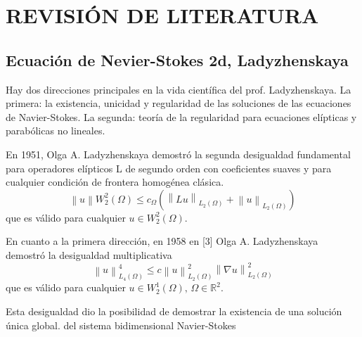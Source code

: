 

\chapter{REVISIÓN DE LITERATURA}
\section{Ecuación de Nevier-Stokes 2d, Ladyzhenskaya}
Hay dos direcciones principales en la vida científica del prof. Ladyzhenskaya. La primera: la existencia, unicidad y regularidad de las soluciones de las ecuaciones de Navier-Stokes. La segunda: teoría de la regularidad para ecuaciones elípticas y parabólicas no lineales.

En 1951, Olga A. Ladyzhenskaya demostró la segunda desigualdad fundamental para operadores elípticos L de segundo orden con coeficientes suaves y para cualquier condición de frontera homogénea clásica.
\begin{equation}
    \left\lVert u \right\rVert W_2^2 (\Omega)\leq c_{\Omega} \left( \left\lVert Lu\right\rVert_{L_2(\Omega)} +\left\lVert u\right\rVert_{L_2(\Omega)} \right)
\end{equation}
que es válido para cualquier $u\in W_2^2(\Omega)$.

En cuanto a la primera dirección, en 1958 en [3] Olga A. Ladyzhenskaya demostró la desigualdad multiplicativa
\begin{equation}
    \left\lVert u \right\rVert_{L_4(\Omega)}^4\leq c \left\lVert u\right\rVert_{L_2(\Omega)}^2\left\lVert \nabla u\right\rVert_{L_2(\Omega)}^2  
\end{equation}
que es válido para cualquier $u\in W_2^1(\Omega),\, \Omega\in \mathbb{R}^2$.

Esta desigualdad dio la posibilidad de demostrar la existencia de una solución única global. del sistema bidimensional Navier-Stokes